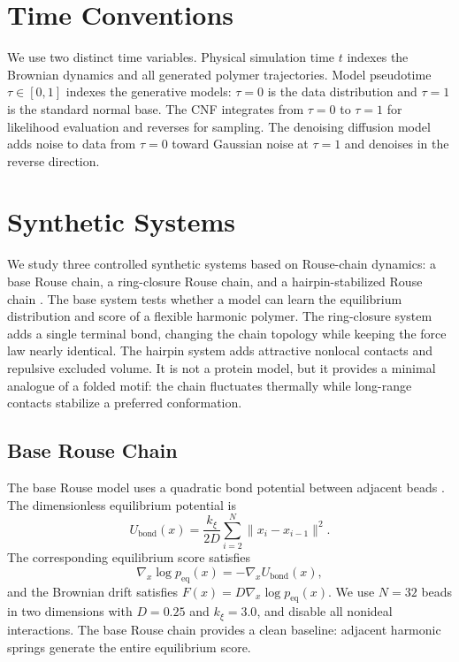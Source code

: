\documentclass[reprint,amsmath,amssymb,aps,pra,10pt]{revtex4-2}
\begin{document}
\section{Time Conventions}

We use two distinct time variables.
Physical simulation time $t$ indexes the Brownian dynamics and all generated polymer trajectories.
Model pseudotime $\tau \in [0,1]$ indexes the generative models: $\tau=0$ is the data distribution and $\tau=1$ is the standard normal base.
The CNF integrates from $\tau=0$ to $\tau=1$ for likelihood evaluation and reverses for sampling.
The denoising diffusion model adds noise to data from $\tau=0$ toward Gaussian noise at $\tau=1$ and denoises in the reverse direction.

\section{Synthetic Systems}

We study three controlled synthetic systems based on Rouse-chain dynamics: a base Rouse chain, a ring-closure Rouse chain, and a hairpin-stabilized Rouse chain \cite{rouse1953}.
The base system tests whether a model can learn the equilibrium distribution and score of a flexible harmonic polymer.
The ring-closure system adds a single terminal bond, changing the chain topology while keeping the force law nearly identical.
The hairpin system adds attractive nonlocal contacts and repulsive excluded volume.
It is not a protein model, but it provides a minimal analogue of a folded motif: the chain fluctuates thermally while long-range contacts stabilize a preferred conformation.

\subsection*{Base Rouse Chain}

The base Rouse model uses a quadratic bond potential between adjacent beads \cite{rouse1953}.
The dimensionless equilibrium potential is
\begin{equation}
    U_{\mathrm{bond}}(x)
    =
    \frac{k_\xi}{2D}
    \sum_{i=2}^{N}
    \|x_i - x_{i-1}\|^2.
\end{equation}
The corresponding equilibrium score satisfies
\begin{equation}
    \nabla_x \log p_{\mathrm{eq}}(x)
    =
    -
    \nabla_x U_{\mathrm{bond}}(x),
\end{equation}
and the Brownian drift satisfies $F(x)=D\nabla_x\log p_{\mathrm{eq}}(x)$.
We use $N=32$ beads in two dimensions with $D=0.25$ and $k_\xi=3.0$, and disable all nonideal interactions.
The base Rouse chain provides a clean baseline: adjacent harmonic springs generate the entire equilibrium score.
\end{document}
